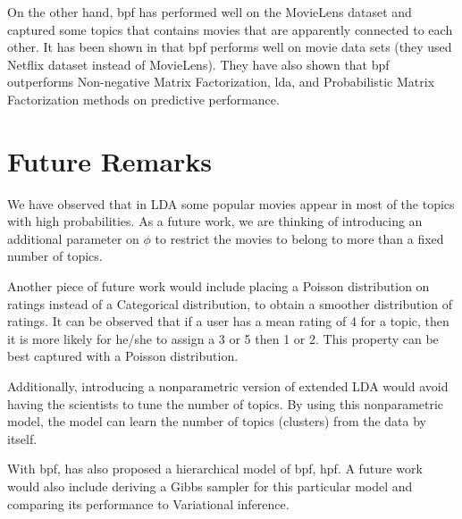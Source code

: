 \documentclass{article} %
\begin{document}
On the other hand, \gls{bpf} has performed well on the MovieLens dataset and 
captured some topics that contains movies that are apparently connected to each 
other. It has been shown in \cite{gopalan2013scalable} that \gls{bpf} performs 
well on movie data sets (they used Netflix dataset instead of MovieLens). They 
have also shown that \gls{bpf} outperforms Non-negative Matrix Factorization, 
\gls{lda}, and Probabilistic Matrix Factorization methods on predictive 
performance. 

\section{Future Remarks}
We have observed that in LDA some popular movies appear in most of the topics with high probabilities. 
As a future work, we are thinking of introducing an additional parameter on $\phi$ 
to restrict the movies to belong to more than a fixed number of topics. 

Another piece of future work would include placing a Poisson distribution on ratings instead of a
Categorical distribution, to obtain a smoother distribution of	 ratings. It can 
be observed that if a user has a mean rating of 4 for a topic, then it is more 
likely for he/she to assign a 3 or 5 then 1 or 2. This property can be best 
captured with a Poisson distribution. 

Additionally, introducing a nonparametric version of extended LDA would avoid having 
the scientists to tune the number of topics. By using this nonparametric model, the 
model can learn the number of topics (clusters) from the data by itself. 

With \gls{bpf}, \cite{gopalan2013scalable} has also proposed a hierarchical 
model of \gls{bpf}, \gls{hpf}. A future work would also include deriving a Gibbs 
sampler for this particular model and comparing its performance to Variational 
inference. 



\end{document}
